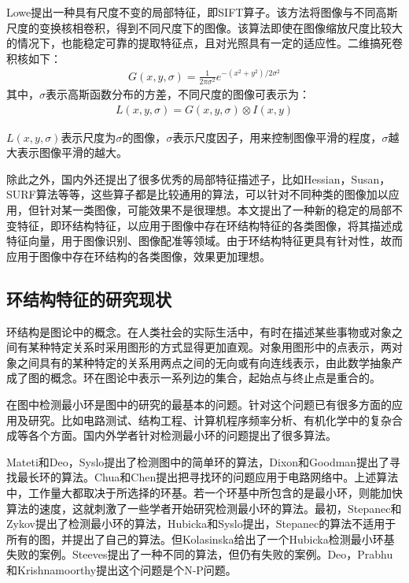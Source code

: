 Lowe提出一种具有尺度不变的局部特征，即SIFT算子\cite{lowe}。该方法将图像与不同高斯尺度的变换核相卷积，得到不同尺度下的图像。该算法即使在图像缩放尺度比较大的情况下，也能稳定可靠的提取特征点，且对光照具有一定的适应性。二维搞死卷积核如下：
\begin{align}
G(x, y, \sigma) = \frac{1}{2\pi\sigma^2}e^{-(x^2+y^2)/2\sigma^2}
\end{align}
其中，$\sigma$表示高斯函数分布的方差，不同尺度的图像可表示为：
\begin{align}
L(x, y, \sigma) = G(x, y, \sigma) \otimes I(x, y)
\end{align}

$L(x, y, \sigma)$表示尺度为$\sigma$的图像，$\sigma$表示尺度因子，用来控制图像平滑的程度，$\sigma$越大表示图像平滑的越大。

除此之外，国内外还提出了很多优秀的局部特征描述子，比如Hessian，Susan\cite{smith}，SURF\cite{bay}算法等等，这些算子都是比较通用的算法，可以针对不同种类的图像加以应用，但针对某一类图像，可能效果不是很理想。本文提出了一种新的稳定的局部不变特征，即环结构特征，以应用于图像中存在环结构特征的各类图像，将其描述成特征向量，用于图像识别、图像配准等领域。由于环结构特征更具有针对性，故而应用于图像中存在环结构的各类图像，效果更加理想。

\subsection{环结构特征的研究现状}
\label{sec:complicatedtable}

环结构是图论中的概念。在人类社会的实际生活中，有时在描述某些事物或对象之间有某种特定关系时采用图形的方式显得更加直观。对象用图形中的点表示，两对象之间具有的某种特定的关系用两点之间的无向或有向连线表示，由此数学抽象产成了图的概念\cite{xujunming}。环在图论中表示一系列边的集合，起始点与终止点是重合的。

在图中检测最小环是图中的研究的最基本的问题。针对这个问题已有很多方面的应用及研究。比如电路测试、结构工程、计算机程序频率分析、有机化学中的复杂合成等各个方面。国内外学者针对检测最小环的问题提出了很多算法。

Mateti和Deo\cite{mateti}，Syslo\cite{syslo}提出了检测图中的简单环的算法，Dixon和Goodman\cite{goodman}提出了寻找最长环的算法。Chua和Chen提出把寻找环的问题应用于电路网络中\cite{chua}。上述算法中，工作量大都取决于所选择的环基。若一个环基中所包含的是最小环，则能加快算法的速度，这就刺激了一些学者开始研究检测最小环的算法。最初，Stepanec和Zykov提出了检测最小环的算法\cite{stepanec}，Hubicka和Syslo\cite{hubicka}提出，Stepanec的算法不适用于所有的图，并提出了自己的算法。但Kolasinska\cite{kola}给出了一个Hubicka检测最小环基失败的案例。Steeves提出了一种不同的算法，但仍有失败的案例。Deo，Prabhu和Krishnamoorthy\cite{deo}提出这个问题是个N-P问题。

